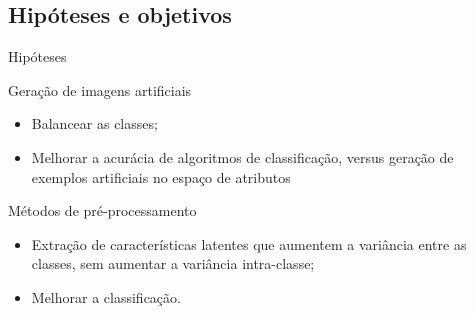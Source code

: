 \documentclass{beamer}
\begin{document}
\subsection{Hipóteses e objetivos}
\setlength\leftmargini{1em}
\justifying
 \begin{frame}{Hipóteses}
  \begin{block}{Geração de imagens artificiais}
    \justifying
    \begin{itemize}
      \item Balancear as classes;
      \item Melhorar a acurácia de algoritmos de classificação, versus geração de exemplos artificiais no espaço de atributos
    \end{itemize}
  \end{block}
  \begin{block}{Métodos de pré-processamento}
    \justifying
    \begin{itemize}
      \item Extração de características latentes que aumentem a variância entre as classes, sem aumentar a variância intra-classe;
      \item Melhorar a classificação.
    \end{itemize}
  \end{block}
\end{frame}
\end{document}
